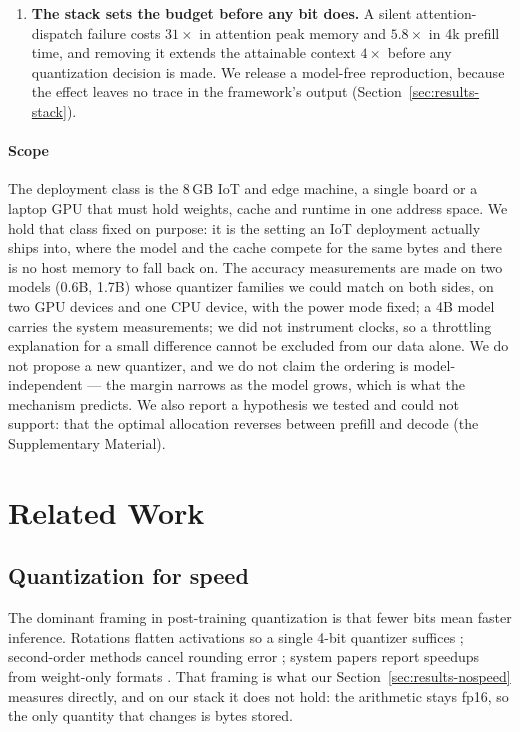 \documentclass[10pt,journal]{IEEEtran}
\begin{document}
\begin{enumerate}
\item \textbf{The stack sets the budget before any bit does.} A silent
      attention-dispatch failure costs $31\times$ in attention peak memory and
      $5.8\times$ in 4k prefill time, and removing it extends the attainable
      context $4\times$ before any quantization decision is made. We release a
      model-free reproduction, because the effect leaves no trace in the
      framework's output (Section~\ref{sec:results-stack}).
\end{enumerate}

\paragraph*{Scope}
The deployment class is the $8$\,GB IoT and edge machine, a single board or a
laptop GPU that must hold weights, cache and runtime in one address space. We hold that class fixed on purpose: it is the setting an IoT deployment actually ships into, where the model and the cache compete for the same bytes and there is no host memory to fall back on.
The accuracy measurements are made on two models (0.6B, 1.7B) whose quantizer families we
could match on both sides, on two GPU devices and one CPU device, with the power mode fixed; a 4B model carries the system measurements; we did not
instrument clocks, so a throttling explanation for a small difference cannot be
excluded from our data alone. We do not propose a new quantizer, and we do not
claim the ordering is model-independent --- the margin narrows as the model
grows, which is what the mechanism predicts. We also report a hypothesis we
tested and could not support: that the optimal allocation reverses between
prefill and decode (the Supplementary Material).

\section{Related Work}
\label{sec:related}

\subsection{Quantization for speed}
The dominant framing in post-training quantization is that fewer bits mean
faster inference. Rotations flatten activations so a single 4-bit quantizer
suffices \cite{quarot,spinquant,duquant,prefixquant,ostquant,spectrumquant};
second-order methods cancel rounding error \cite{gptq,gptaq}; system papers
report speedups from weight-only formats \cite{awq}. That framing is what our
Section~\ref{sec:results-nospeed} measures directly, and on our stack it does
not hold: the arithmetic stays fp16, so the only quantity that changes is bytes
stored.
\end{document}
